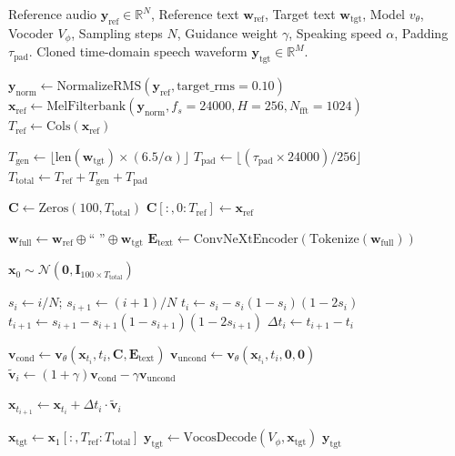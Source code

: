 \begin{algorithm}[htbp]
\caption{Continuous Flow Matching Zero-Shot Voice Synthesis}
\label{alg:cfm_generation}
\begin{algorithmic}[1]
\Require Reference audio $\mathbf{y}_{\text{ref}} \in \mathbb{R}^N$, Reference text $\mathbf{w}_{\text{ref}}$, Target text $\mathbf{w}_{\text{tgt}}$, Model $v_\theta$, Vocoder $V_\phi$, Sampling steps $N$, Guidance weight $\gamma$, Speaking speed $\alpha$, Padding $\tau_{\text{pad}}$.
\Ensure Cloned time-domain speech waveform $\mathbf{y}_{\text{tgt}} \in \mathbb{R}^M$.

\State $\mathbf{y}_{\text{norm}} \gets \text{NormalizeRMS}(\mathbf{y}_{\text{ref}}, \text{target\_rms}=0.10)$
\State $\mathbf{x}_{\text{ref}} \gets \text{MelFilterbank}(\mathbf{y}_{\text{norm}}, f_s=24000, H=256, N_{\text{fft}}=1024)$
\State $T_{\text{ref}} \gets \text{Cols}(\mathbf{x}_{\text{ref}})$

\State $T_{\text{gen}} \gets \lfloor \text{len}(\mathbf{w}_{\text{tgt}}) \times (6.5 / \alpha) \rfloor$
\State $T_{\text{pad}} \gets \lfloor (\tau_{\text{pad}} \times 24000) / 256 \rfloor$
\State $T_{\text{total}} \gets T_{\text{ref}} + T_{\text{gen}} + T_{\text{pad}}$

\State $\mathbf{C} \gets \text{Zeros}(100, T_{\text{total}})$
\State $\mathbf{C}[:, 0 : T_{\text{ref}}] \gets \mathbf{x}_{\text{ref}}$ 

\State $\mathbf{w}_{\text{full}} \gets \mathbf{w}_{\text{ref}} \oplus \text{`` ''} \oplus \mathbf{w}_{\text{tgt}}$
\State $\mathbf{E}_{\text{text}} \gets \text{ConvNeXtEncoder}(\text{Tokenize}(\mathbf{w}_{\text{full}}))$

\State $\mathbf{x}_0 \sim \mathcal{N}(\mathbf{0}, \mathbf{I}_{100 \times T_{\text{total}}})$ 

    \State $s_i \gets i / N$; \quad $s_{i+1} \gets (i+1) / N$
    \State $t_i \gets s_i - s_i(1 - s_i)(1 - 2s_i)$ 
    \State $t_{i+1} \gets s_{i+1} - s_{i+1}(1 - s_{i+1})(1 - 2s_{i+1})$
    \State $\Delta t_i \gets t_{i+1} - t_i$
    
    \State $\mathbf{v}_{\text{cond}} \gets \mathbf{v}_\theta(\mathbf{x}_{t_i}, t_i, \mathbf{C}, \mathbf{E}_{\text{text}})$
    \State $\mathbf{v}_{\text{uncond}} \gets \mathbf{v}_\theta(\mathbf{x}_{t_i}, t_i, \mathbf{0}, \mathbf{0})$
    \State $\tilde{\mathbf{v}}_i \gets (1 + \gamma)\mathbf{v}_{\text{cond}} - \gamma \mathbf{v}_{\text{uncond}}$ 
    
    \State $\mathbf{x}_{t_{i+1}} \gets \mathbf{x}_{t_i} + \Delta t_i \cdot \tilde{\mathbf{v}}_i$ 
\EndFor

\State $\mathbf{x}_{\text{tgt}} \gets \mathbf{x}_1[:, T_{\text{ref}} : T_{\text{total}}]$ 
\State $\mathbf{y}_{\text{tgt}} \gets \text{VocosDecode}(V_\phi, \mathbf{x}_{\text{tgt}})$
\State \Return $\mathbf{y}_{\text{tgt}}$
\end{algorithmic}
\end{algorithm}

